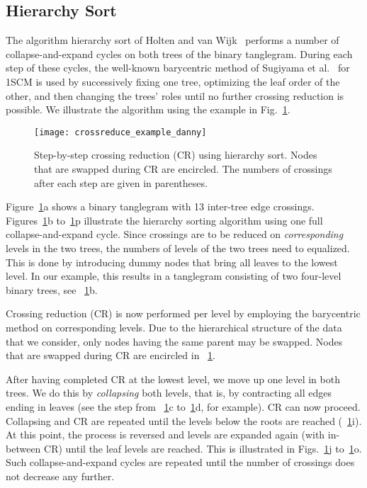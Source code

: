 \documentclass[runningheads,a4paper]{llncs}
\begin{document}
\subsection{Hierarchy Sort}\label{sec:hier-sort-algo}

The algorithm hierarchy sort of Holten and van Wijk~\cite{hw-vchod-08}
performs a number of collapse-and-expand cycles on both trees of the
binary tanglegram.  During each step of these cycles, the well-known
barycentric method of Sugiyama et al.~\cite{stt-mvuhs-81} for 1SCM is
used by successively fixing one tree, optimizing
the leaf order of the other, and then changing the trees' roles until no
further crossing reduction is possible. 
We illustrate the algorithm using the example in
Fig.~\ref{fig:hierarchysorting}. 

\begin{figure}[tb]
  {\texttt{[image: crossreduce\_example\_danny]}}
  \caption{Step-by-step crossing reduction (CR) using hierarchy sort. Nodes that are swapped during CR
    are encircled. The numbers of crossings after each step are given in parentheses.}
  \label{fig:hierarchysorting}
\end{figure}

Figure~\ref{fig:hierarchysorting}a shows a binary tanglegram with 13
inter-tree edge crossings.  Figures~\ref{fig:hierarchysorting}b
to~\ref{fig:hierarchysorting}p illustrate the hierarchy sorting
algorithm using one full collapse-and-expand cycle. Since crossings
are to be reduced on \emph{corresponding} levels in the two trees,
the numbers of levels of the two trees need to equalized.  This is
done by introducing dummy nodes that bring all leaves to the lowest
level.  In our example, this results in a
tanglegram consisting of two four-level binary trees, see
\figurename~\ref{fig:hierarchysorting}b.

Crossing reduction (CR) is now performed per level by employing the
barycentric method on corresponding levels. Due to the hierarchical
structure of the data that we consider, only nodes having the
same parent may be swapped.  Nodes that
are swapped during CR are encircled in
\figurename~\ref{fig:hierarchysorting}.

After having completed CR at the lowest level, we move up one
level in both trees.  We do this by \emph{collapsing} both levels,
that is, by contracting all edges ending in leaves (see the step
from \figurename~\ref{fig:hierarchysorting}c
to~\ref{fig:hierarchysorting}d, for example).  CR can now proceed.
Collapsing and CR are repeated until the levels below the roots are
reached (\figurename~\ref{fig:hierarchysorting}i).  At this point,
the process is reversed and levels are expanded again (with
in-between CR) until the leaf levels are reached.  This is
illustrated in Figs.~\ref{fig:hierarchysorting}j
to~\ref{fig:hierarchysorting}o. Such collapse-and-expand cycles are 
repeated until the number of crossings does not decrease any
further.
\end{document}
